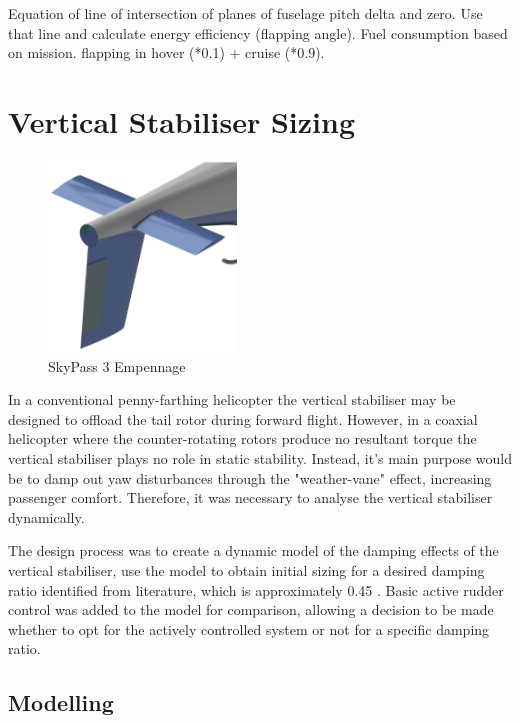 \documentclass[11pt,a4paper]{article}
\begin{document}
Equation of line of intersection of planes of fuselage pitch delta and zero. Use that line and calculate energy efficiency (flapping angle). Fuel consumption based on mission. flapping in hover (*0.1) + cruise (*0.9).

\section{Vertical Stabiliser Sizing}


\begin{figure}
    \includegraphics[width=5cm]{Empennage.png}
    \caption{SkyPass 3 Empennage }
    \label{fig:emp}
\end{figure}
In a conventional penny-farthing helicopter the vertical stabiliser may be designed to offload the tail rotor during forward flight. However, in a coaxial helicopter where the counter-rotating rotors produce no resultant torque the vertical stabiliser plays no role in static stability. Instead, it's main purpose would be to damp out yaw disturbances through the "weather-vane" effect, increasing passenger comfort. Therefore, it was necessary to analyse the vertical stabiliser dynamically.


The design process was to create a dynamic model of the damping effects of the vertical stabiliser, use the model to obtain initial sizing for a desired damping ratio identified from literature, which is approximately 0.45 \cite{prouty}. Basic active rudder control was added to the model for comparison, allowing a decision to be made whether to opt for the actively controlled system or not for a specific damping ratio.
\subsection{Modelling}
\end{document}
